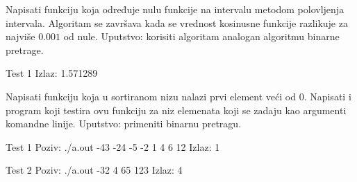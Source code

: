 \begin{Exercise}[label=405]
  Napisati funkciju koja određuje nulu funkcije  na
  intervalu \argf{[0,2]} metodom polovljenja intervala. Algoritam se završava kada se
  vrednost kosinusne funkcije razlikuje za najviše $0.001$ od nule. Uputstvo: korisiti algoritam analogan algoritmu binarne pretrage.
  
  
\begin{minitest}
\begin{test}{Test 1}
Izlaz:
1.571289
\end{test}
\end{minitest}
  
\end{Exercise}

\begin{Exercise}[label=406]
  Napisati funkciju koja u sortiranom nizu nalazi prvi element veći od
  0. Napisati i program koji
  testira ovu funkciju za niz elemenata koji se zadaju kao argumenti
  komandne linije. Uputstvo: primeniti binarnu pretragu.
  
\begin{miditest}
\begin{test}{Test 1}
Poziv:  ./a.out -43 -24 -5 -2 1 4 6 12
Izlaz:  1
\end{test}
\end{miditest}

\begin{miditest}
\begin{test}{Test 2}
Poziv:  ./a.out -32 4 65 123
Izlaz:  4
\end{test}
\end{miditest}
  
\end{Exercise}

